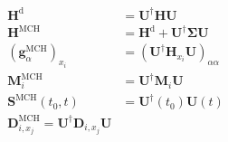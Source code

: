 \documentclass{article}
\begin{document}
\begin{align}
  \mathbf{H}^{\text{d}}&=\mathbf{U}^\dagger\mathbf{H}\mathbf{U}\nonumber\\
  \mathbf{H}^{\text{MCH}}&=\mathbf{H}^{\text{d}}+\mathbf{U}^\dagger\boldsymbol{\Sigma}\mathbf{U}\nonumber\\
  \left(\mathbf{g}^{\text{MCH}}_\alpha\right)_{x_i}&=\left(\mathbf{U}^\dagger\mathbf{H}_{x_i}\mathbf{U}\right)_{\alpha\alpha}\nonumber\\
  \mathbf{M}^{\text{MCH}}_i&=\mathbf{U}^\dagger\mathbf{M}_i\mathbf{U}\nonumber\\
  \mathbf{S}^{\text{MCH}}(t_0,t)&=\mathbf{U}^\dagger(t_0)\mathbf{U}(t)\nonumber\\
  \mathbf{D}^{\text{MCH}}_{i,x_j}=\mathbf{U}^\dagger\mathbf{D}_{i,x_j}\mathbf{U}
\nonumber\end{align}
\end{document}
